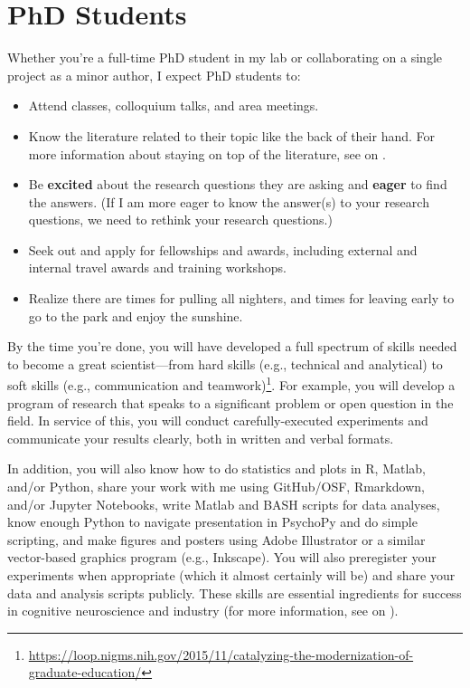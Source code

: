 \documentclass[letterpaper,11pt,oneside]{memoir}
\begin{document}
\section{PhD Students}

Whether you're a full-time PhD student in my lab or collaborating on a single project as a minor author, I expect PhD students to:

\begin{itemize}
\item Attend classes, colloquium talks, and area meetings.
\item Know the literature related to their topic like the back of their hand. For more information about staying on top of the literature, see  on .
\item Be \textbf{excited} about the research questions they are asking and \textbf{eager} to find the answers. (If I am more eager to know the answer(s) to your research questions, we need to rethink your research questions.)
\item Seek out and apply for fellowships and awards, including external and internal travel awards and training workshops.
\item Realize there are times for pulling all nighters, and times for leaving early to go to the park and enjoy the sunshine.
\end{itemize}

By the time you're done, you will have developed a full spectrum of skills needed to become a great scientist---from hard skills (e.g., technical and analytical) to soft skills (e.g., communication and teamwork)\footnote{\url{https://loop.nigms.nih.gov/2015/11/catalyzing-the-modernization-of-graduate-education/}}. For example, you will develop a program of research that speaks to a significant problem or open question in the field. In service of this, you will conduct carefully-executed experiments and communicate your results clearly, both in written and verbal formats. 

In addition, you will also know how to do statistics and plots in R, Matlab, and/or Python, share your work with me using GitHub/OSF, Rmarkdown, and/or Jupyter Notebooks, write Matlab and BASH scripts for data analyses, know enough Python to navigate presentation in PsychoPy and do simple scripting, and make figures and posters using Adobe Illustrator or a similar vector-based graphics program (e.g., Inkscape). You will also preregister your experiments when appropriate (which it almost certainly will be) and share your data and analysis scripts publicly. These skills are essential ingredients for success in cognitive neuroscience and industry (for more information, see  on ).
\end{document}

